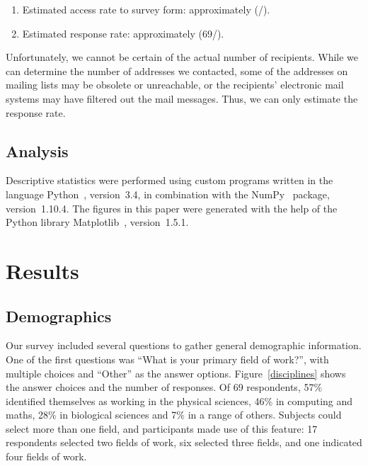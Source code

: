 \documentclass[review]{elsarticle}
\newcommand{\totalRespondents}{69\xspace}
\begin{document}
\begin{enumerate}[itemsep=-0.5ex]

\item Estimated access rate to survey form: approximately \accessRate  (\totalClicks/\totalPotentialRecipients).

\item Estimated response rate: approximately \populationResponseRate (\totalRespondents/\totalPotentialRecipients).

\end{enumerate}

Unfortunately, we cannot be certain of the actual number of recipients.  While we can determine the number of addresses we contacted, some of the addresses on mailing lists may be obsolete or unreachable, or the recipients' electronic mail systems may have filtered out the mail messages.  Thus, we can only estimate the response rate.


\subsection{Analysis}

Descriptive statistics were performed using custom programs written in the language Python~\citep{vanRossum1991interactively, perez2011python}, version~3.4, in combination with the NumPy~\citep{vanderwalt2011numpy} package, version~1.10.4.  The figures in this paper were generated with the help of the Python library Matplotlib~\citep{hunter2007matplotlib}, version~1.5.1.


\section{Results}
\label{results}


\subsection{Demographics}
\label{results-demographics}

Our survey included several questions to gather general demographic information.  One of the first questions was ``What is your primary field of work?'', with multiple choices and ``Other'' as the answer options.  Figure~\ref{disciplines} shows the answer choices and the number of responses.  Of \totalRespondents respondents, 57\% identified themselves as working in the physical sciences, 46\% in computing and maths, 28\% in biological sciences and 7\% in a range of others.  Subjects could select more than one field, and participants made use of this feature: 17 respondents selected two fields of work, six selected three fields, and one indicated four fields of work.
\end{document}
